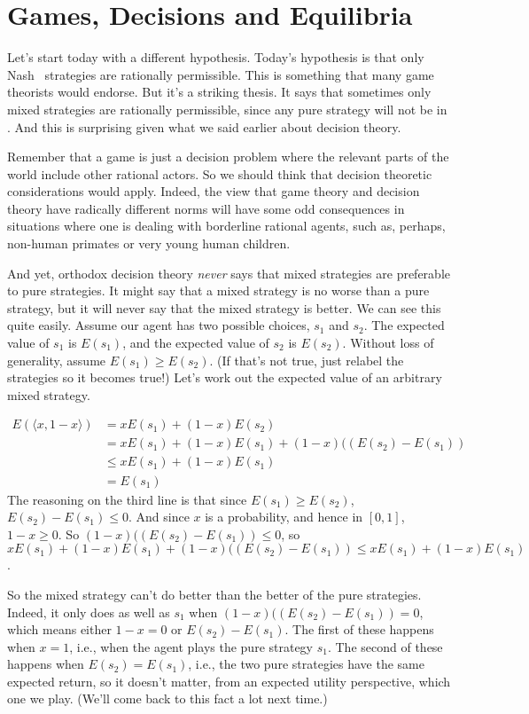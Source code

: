\chapter{Games, Decisions and Equilibria}

Let's start today with a different hypothesis. Today's hypothesis is that only Nash \Eqm\ strategies are rationally permissible. This is something that many game theorists would endorse. But it's a striking thesis. It says that sometimes only mixed strategies are rationally permissible, since any pure strategy will not be in \eqm. And this is surprising given what we said earlier about decision theory.

Remember that a game is just a decision problem where the relevant parts of the world include other rational actors. So we should think that decision theoretic considerations would apply. Indeed, the view that game theory and decision theory have radically different norms will have some odd consequences in situations where one is dealing with borderline rational agents, such as, perhaps, non-human primates or very young human children.

And yet, orthodox decision theory \textit{never} says that mixed strategies are preferable to pure strategies. It might say that a mixed strategy is no worse than a pure strategy, but it will never say that the mixed strategy is better. We can see this quite easily. Assume our agent has two possible choices, $s_1$ and $s_2$. The expected value of $s_1$ is $E(s_1)$, and the expected value of $s_2$ is $E(s_2)$. Without loss of generality, assume $E(s_1) \geq E(s_2)$. (If that's not true, just relabel the strategies so it becomes true!) Let's work out the expected value of an arbitrary mixed strategy.

\begin{align*}
E(\langle x, 1-x \rangle) &= xE(s_1) + (1-x)E(s_2) \\
&= xE(s_1) + (1-x)E(s_1) + (1-x)((E(s_2) - E(s_1)) \\
&\leq  xE(s_1) + (1-x)E(s_1) \\
&= E(s_1) 
\end{align*} \noindent The reasoning on the third line is that since $E(s_1) \geq E(s_2)$, $E(s_2) - E(s_1) \leq 0$. And since $x$ is a probability, and hence in $[0, 1]$, $1-x \geq 0$. So $(1-x)((E(s_2) - E(s_1)) \leq 0$, so $xE(s_1) + (1-x)E(s_1) + (1-x)((E(s_2) - E(s_1)) \leq  xE(s_1) + (1-x)E(s_1)$.

So the mixed strategy can't do better than the better of the pure strategies. Indeed, it only does as well as $s_1$ when $(1-x)((E(s_2) - E(s_1)) = 0$, which means either $1-x = 0$ or  $E(s_2) - E(s_1)$. The first of these happens when $x=1$, i.e., when the agent plays the pure strategy $s_1$. The second of these happens when $E(s_2) = E(s_1)$, i.e., the two pure strategies have the same expected return, so it doesn't matter, from an expected utility perspective, which one we play. (We'll come back to this fact a lot next time.)

